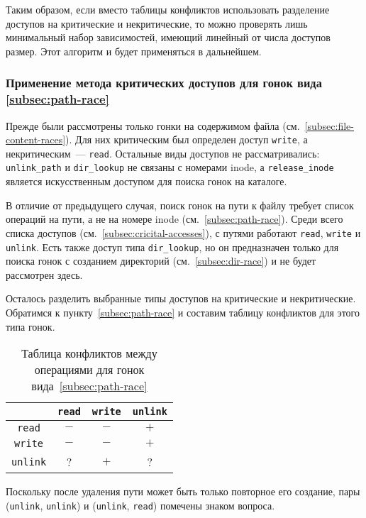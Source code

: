 Таким образом, если вместо таблицы конфликтов использовать разделение доступов на критические и некритические, то можно проверять лишь минимальный набор зависимостей, имеющий линейный от числа доступов размер. Этот алгоритм и будет применяться в дальнейшем.

\subsubsection{Применение метода критических доступов для гонок вида \ref{subsec:path-race}}

Прежде были рассмотрены только гонки на содержимом файла (см.~\ref{subsec:file-content-races}). Для них критическим был определен доступ \texttt{write}, а некритическим~--- \texttt{read}. Остальные виды доступов не рассматривались: \texttt{unlink\_path} и \texttt{dir\_lookup} не связаны с номерами inode, а \texttt{release\_inode} является искусственным доступом для поиска гонок на каталоге.

В отличие от предыдущего случая, поиск гонок на пути к файлу требует список операций на пути, а не на номере inode (см.~\ref{subsec:path-race}). Среди всего списка доступов (см.~\ref{subsec:cricital-accesses}), с путями работают \texttt{read}, \texttt{write} и \texttt{unlink}. Есть также доступ типа \texttt{dir\_lookup}, но он предназначен только для поиска гонок с созданием директорий (см.~\ref{subsec:dir-race}) и не будет рассмотрен здесь.

Осталось разделить выбранные типы доступов на критические и некритические. Обратимся к пункту~\ref{subsec:path-race} и составим таблицу конфликтов для этого типа гонок.

\begin{table}[htbp]
    \centering
    \begin{tabular}{cccc}
        \toprule
        & \texttt{read} & \texttt{write} & \texttt{unlink} \\
        \midrule
        \texttt{read} & $-$ & $-$ & $+$\\
        \texttt{write} & $-$ & $-$ & $+$\\
        \texttt{unlink} & ? & $+$ & ?\\
        \bottomrule
    \end{tabular}
    \caption{Таблица конфликтов между операциями для гонок вида~\ref{subsec:path-race}}
    \label{tab:conflict-table-path-race}
\end{table}

Поскольку после удаления пути может быть только повторное его создание, пары (\texttt{unlink}, \texttt{unlink}) и (\texttt{unlink}, \texttt{read}) помечены знаком вопроса.

